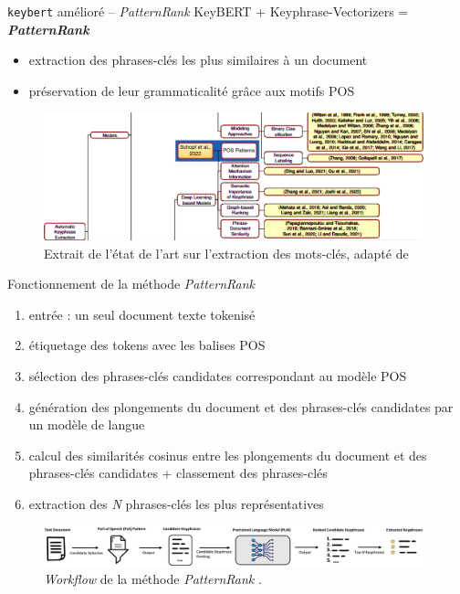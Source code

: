 \begin{frame}{\texttt{keybert} amélioré -- \textit{PatternRank}}
\pause Key\textsc{BERT} + Keyphrase-Vectorizers = \textit{\textbf{PatternRank}} \hfill {\small\citep{schopf2022}}
\pause
\begin{itemize}[<+->]
\item extraction des phrases-clés les plus similaires à un document
\item préservation de leur grammaticalité grâce aux motifs POS
\end{itemize}
\begin{figure}
    \centering
    \includegraphics[width=110mm,scale=0.5]{pic/sota_lm_adapte.png}
    \caption{Extrait de l'état de l'art sur l'extraction des mots-clés, adapté de \citet{xie2023}}
    \label{fig:enter-label}
\end{figure}
\end{frame}

\begin{frame}{Fonctionnement de la méthode \textit{PatternRank}}
\begin{enumerate}[<+->]
\item entrée : un seul document texte tokenisé
\item étiquetage des tokens avec les balises POS
\item sélection des phrases-clés candidates correspondant au modèle POS 
\item génération des plongements du document et des phrases-clés candidates par un modèle de langue
\item calcul des similarités cosinus entre les plongements du document et des phrases-clés candidates + classement des phrases-clés
\item extraction des \textit{N} phrases-clés les plus représentatives
\end{enumerate}
\begin{figure}
    \centering
    \includegraphics[width=110mm,scale=0.5]{pic/patternrank_workflow.png}
    \caption{\textit{Workflow} de la méthode \textit{PatternRank} \citep{schopf2022}.}
    \label{fig:enter-label}
\end{figure}
\end{frame}

